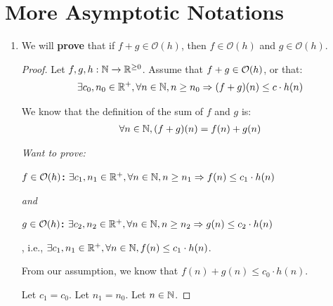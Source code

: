 \documentclass[12pt]{article}
\theoremstyle{definition}
\begin{document}
\newpage
\section{More Asymptotic Notations}

    \begin{enumerate}
        \item We will \textbf{prove} that if $f + g \in \mathcal{O}(h)$, then $f \in \mathcal{O}(h)$ and $g \in \mathcal{O}(h)$.
            
            \begin{proof}
                Let $f, g, h : \mathbb N \xrightarrow{} \mathbb R^{\geq 0}$.
                Assume that $f + g \in \mathcal O (h)$, or that:
                \begin{align*}
                    \exists c_0, n_0 \in \mathbb R^+, \forall n \in \mathbb N, n \geq n_0 \mathrel{\Rightarrow} (f+g)(n) \leq c \cdot h(n)
                \end{align*}
                
                We know that the definition of the sum of $f$ and $g$ is:
                \begin{align*}
                    \forall n \in \mathbb N, (f + g)(n) = f(n) + g(n)
                \end{align*}
                
                \emph{Want to prove:} 
                
                \textbf{$f \in \mathcal O(h)$:} $\exists c_1, n_1 \in \mathbb R^+, \forall n \in \mathbb N, n \geq n_1 \mathrel{\Rightarrow} f(n) \leq c_1 \cdot h(n)$
                
                \textit{and}
                
                \textbf{$g \in \mathcal O(h)$:} $\exists c_2, n_2 \in \mathbb R^+, \forall n \in \mathbb N, n \geq n_2 \mathrel{\Rightarrow} g(n) \leq c_2 \cdot h(n)$
                
                \vspace{0.25cm}
                , i.e., $\exists c_1, n_1 \in \mathbb R^+, \forall n \in \mathbb N, f(n) \leq c_1 \cdot h(n)$.
                
                From our assumption, we know that $f(n) + g(n) \leq c_0 \cdot h(n)$.
                
                Let $c_1 = c_0$.
                Let $n_1 = n_0$.
                Let $n \in \mathbb N$.
                

\end{proof}
\end{enumerate}
\end{document}
